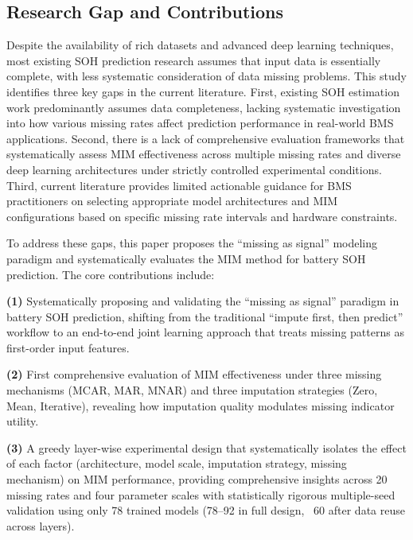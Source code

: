 \documentclass[5p,times]{elsarticle}
\begin{document}
\subsection{Research Gap and Contributions}\label{sec:contributions}

Despite the availability of rich datasets and advanced deep learning techniques, most existing SOH prediction research assumes that input data is essentially complete, with less systematic consideration of data missing problems\cite{shao2025soh,deng2025novel,chen2024batteryMissing}. This study identifies three key gaps in the current literature. First, existing SOH estimation work predominantly assumes data completeness, lacking systematic investigation into how various missing rates affect prediction performance in real-world BMS applications. Second, there is a lack of comprehensive evaluation frameworks that systematically assess MIM effectiveness across multiple missing rates and diverse deep learning architectures under strictly controlled experimental conditions. Third, current literature provides limited actionable guidance for BMS practitioners on selecting appropriate model architectures and MIM configurations based on specific missing rate intervals and hardware constraints.

To address these gaps, this paper proposes the ``missing as signal'' modeling paradigm and systematically evaluates the MIM method for battery SOH prediction. The core contributions include:

\textbf{(1)} Systematically proposing and validating the ``missing as signal'' paradigm in battery SOH prediction, shifting from the traditional ``impute first, then predict'' workflow to an end-to-end joint learning approach that treats missing patterns as first-order input features.

\textbf{(2)} First comprehensive evaluation of MIM effectiveness under three missing mechanisms (MCAR, MAR, MNAR) and three imputation strategies (Zero, Mean, Iterative), revealing how imputation quality modulates missing indicator utility.

\textbf{(3)} A greedy layer-wise experimental design that systematically isolates the effect of each factor (architecture, model scale, imputation strategy, missing mechanism) on MIM performance, providing comprehensive insights across 20 missing rates and four parameter scales with statistically rigorous multiple-seed validation using only 78 trained models (78--92 in full design, ~60 after data reuse across layers).
\end{document}
